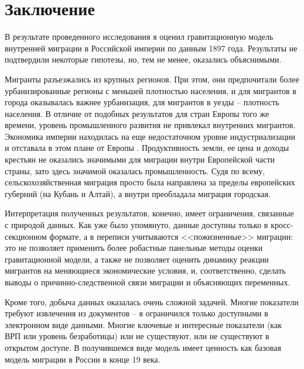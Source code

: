 \documentclass[a4paper,12pt]{article}
\let\oldsection\section
\renewcommand\section{\clearpage\oldsection}
\begin{document}
\afterpage{%
	
}\par


\clearpage
\section{Заключение}


В результате проведенного исследования я оценил гравитационную модель внутренней миграции в Российской империи по данным 1897 года. Результаты не подтвердили некоторые гипотезы, но, тем не менее, оказались объяснимыми. 

Мигранты разъезжались из крупных регионов. При этом, они предпочитали более урбанизированные регионы с меньшей плотностью населения, и для мигрантов в города оказывалась важнее урбанизация, для мигрантов в уезды -- плотность населения. В отличие от подобных результатов для стран Европы того же времени, уровень промышленного развития не привлекал внутренних мигрантов. Экономика империи находилась на еще недостаточном уровне индустриализации и отставала в этом плане от Европы \citep{cheremukhin_industrialization_2017}. Продуктивность земли, ее цена и доходы крестьян не оказались значимыми для миграции внутри Европейской части страны, зато здесь значимой оказалась промышленность. Судя по всему, сельскохозяйственная миграция просто была направлена за пределы европейских губерний (на Кубань и Алтай), а внутри преобладала миграция городская. 

Интерпретация полученных результатов, конечно, имеет ограничения, связанные с природой данных. Как уже было упомянуто, данные доступны только в кросс-секционном формате, а в переписи учитываются <<пожизненные>> миграции: это не позволяет применить более робастные панельные методы оценки гравитационной модели, а также не позволяет оценить динамику реакции мигрантов на меняющиеся экономические условия, и, соответственно, сделать выводы о причинно-следственной связи миграции и объясняющих переменных.

Кроме того, добыча данных оказалась очень сложной задачей. Многие показатели требуют извлечения из документов -- я ограничился только доступными в электронном виде данными. Многие ключевые и интересные показатели (как ВРП или уровень безработицы) или не существуют, или не существуют в открытом доступе. В получившемся виде модель имеет ценность как базовая модель миграции в России в конце 19 века. 
\end{document}
